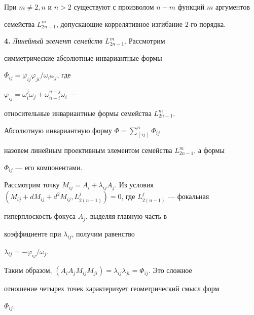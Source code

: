 


\begin{thm} 


При $m\ne2,n$ и $n>2$ существуют с произволом $n-m$ функций $m$ аргументов 


семейства $L^m_{2n-1}$, допускающие коррелятивное изгибание $2$-го порядка.


\end{thm} 


 


{\bf 4.} {\it Линейный элемент семейств $L^m_{2n-1}$}. Рассмотрим 


симметрические абсолютные инвариантные формы 


$\Phi_{ij}=\varphi_{ij}\varphi_{ji}/\omega_i\omega_j$, где 


$\varphi_{ij}=\omega^j_i\omega_j+\omega^{n+j}_{n+i}\omega_i$ --- 


относительные инвариантные формы семейства $L^m_{2n-1}$. 


 


\begin{defn} 


Абсолютную инвариантную форму $\Phi=\sum\limits^n_{(ij)}\Phi_{ij}$ 


назовем линейным проективным элементом семейства $L^m_{2n-1}$, а формы 


$\Phi_{ij}$ --- его компонентами. 


\end{defn} 


 


Рассмотрим точку $M_{ij}=A_i+\lambda_{ij}A_j$. Из условия $(M_{ij}+d 


M_{ij}+d^2M_{ij}, L^j_{2(n-1)})=0$, где $L^j_{2(n-1)}$ --- фокальная 


гиперплоскость фокуса $A_j$, выделяя главную часть в 


коэффициенте при $\lambda_{ij}$, получим равенство


$\lambda_{ij}=-\varphi_{ij}/\omega_j$. 


Таким образом, $(A_i A_j 


M_{ij}M_{ji})=\lambda_{ij}\lambda_{ji}=\Phi_{ij}$. Это сложное 


отношение четырех точек характеризует геометрический смысл форм 


$\Phi_{ij}$. 


 


